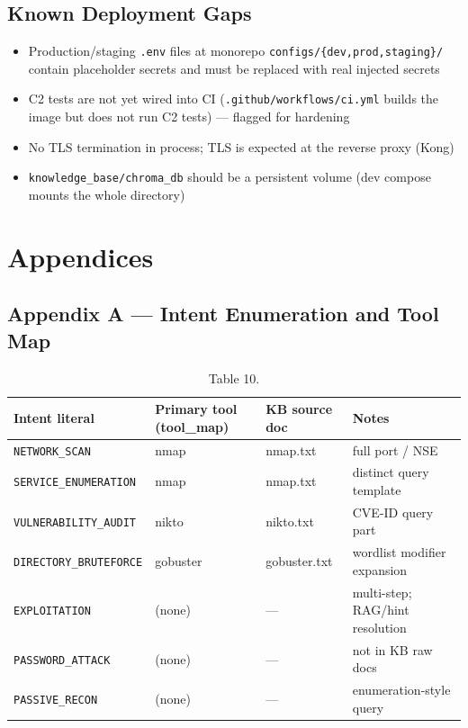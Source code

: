 \documentclass[10pt,journal,onecolumn]{IEEEtran}
\begin{document}
\subsection{Known Deployment Gaps}

\begin{itemize}
\item Production/staging \texttt{.env} files at monorepo \texttt{configs/\allowbreak \{dev,prod,staging\}/\allowbreak } contain placeholder secrets and must be replaced with real injected secrets
\item C2 tests are not yet wired into CI (\texttt{.github/workflows/ci.yml} builds the image but does not run C2 tests) --- flagged for hardening
\item No TLS termination in process; TLS is expected at the reverse proxy (Kong)
\item \texttt{knowledge\_\allowbreak base/\allowbreak chroma\_\allowbreak db} should be a persistent volume (dev compose mounts the whole directory)
\end{itemize}

\section{Appendices}

\subsection{Appendix A --- Intent Enumeration and Tool Map}

\begin{table}[h]
\caption{Table 10.}
\label{tab:t10}
\begin{tabularx}{\columnwidth}{l >{\raggedright\arraybackslash}X >{\raggedright\arraybackslash}X >{\raggedright\arraybackslash}X}
\toprule
\textbf{Intent literal} & \textbf{Primary tool (tool\_map)} & \textbf{KB source doc} & \textbf{Notes}\\
\midrule
\texttt{NETWORK\_SCAN} & nmap & nmap.txt & full port / NSE\\
\texttt{SERVICE\_ENUMERATION} & nmap & nmap.txt & distinct query template\\
\texttt{VULNERABILITY\_AUDIT} & nikto & nikto.txt & CVE-ID query part\\
\texttt{DIRECTORY\_BRUTEFORCE} & gobuster & gobuster.txt & wordlist modifier expansion\\
\texttt{EXPLOITATION} & (none) & --- & multi-step; RAG/hint resolution\\
\texttt{PASSWORD\_ATTACK} & (none) & --- & not in KB raw docs\\
\texttt{PASSIVE\_RECON} & (none) & --- & enumeration-style query\\
\bottomrule
\end{tabularx}
\end{table}
\end{document}
